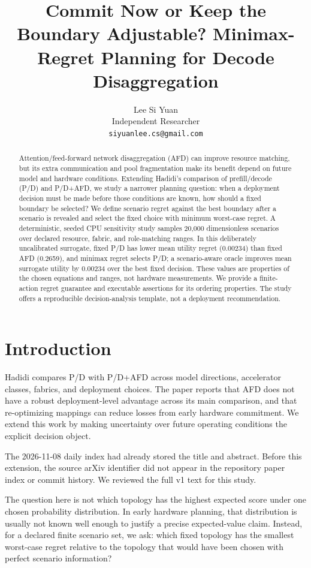 \documentclass[11pt]{article}
\title{Commit Now or Keep the Boundary Adjustable? Minimax-Regret Planning for Decode Disaggregation}
\author{Lee Si Yuan \\
  Independent Researcher \\
  \texttt{siyuanlee.cs@gmail.com}}
\begin{document}
\maketitle
\begin{abstract}
Attention/feed-forward network disaggregation (AFD) can improve resource matching, but its extra communication and pool fragmentation make its benefit depend on future model and hardware conditions. Extending Hadidi's comparison of prefill/decode (P/D) and P/D+AFD, we study a narrower planning question: when a deployment decision must be made before those conditions are known, how should a fixed boundary be selected? We define scenario regret against the best boundary after a scenario is revealed and select the fixed choice with minimum worst-case regret. A deterministic, seeded CPU sensitivity study samples 20,000 dimensionless scenarios over declared resource, fabric, and role-matching ranges. In this deliberately uncalibrated surrogate, fixed P/D has lower mean utility regret (0.00234) than fixed AFD (0.2659), and minimax regret selects P/D; a scenario-aware oracle improves mean surrogate utility by 0.00234 over the best fixed decision. These values are properties of the chosen equations and ranges, not hardware measurements. We provide a finite-action regret guarantee and executable assertions for its ordering properties. The study offers a reproducible decision-analysis template, not a deployment recommendation.
\end{abstract}

\section{Introduction}
Hadidi \citep{hadidi2026split} compares P/D with P/D+AFD across model directions, accelerator classes, fabrics, and deployment choices. The paper reports that AFD does not have a robust deployment-level advantage across its main comparison, and that re-optimizing mappings can reduce losses from early hardware commitment. We extend this work by making uncertainty over future operating conditions the explicit decision object.

The 2026-11-08 daily index had already stored the title and abstract. Before this extension, the source arXiv identifier did not appear in the repository paper index or commit history. We reviewed the full v1 text for this study.

The question here is not which topology has the highest expected score under one chosen probability distribution. In early hardware planning, that distribution is usually not known well enough to justify a precise expected-value claim. Instead, for a declared finite scenario set, we ask: which fixed topology has the smallest worst-case regret relative to the topology that would have been chosen with perfect scenario information?
\end{document}
